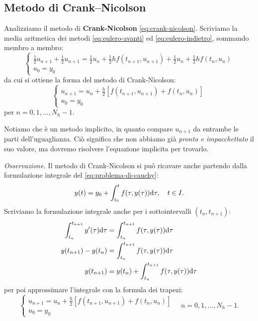 \subsection{Metodo di Crank–Nicolson}
Analizziamo il metodo di \textbf{Crank-Nicolson} \eqref{eq:crank-nicolson}.
Scriviamo la media aritmetica dei metodi \eqref{eq:eulero-avanti} ed \eqref{eq:eulero-indietro}, sommando membro a membro:
\begin{equation*}
\begin{cases}
\frac{1}{2} u_{n+1} +\frac{1}{2} u_{n+1} =\frac{1}{2} u_{n} +\frac{1}{2} hf( t_{n+1} ,u_{n+1}) +\frac{1}{2} u_{n} +\frac{1}{2} hf( t_{n} ,u_{n})\\
u_{0} =y_{0}
\end{cases}
\end{equation*}
da cui si ottiene la forma del metodo di Crank-Nicolson:
\begin{equation}\tag{CN}
	\begin{cases}
	u_{n+1} =u_{n} +\frac{h}{2}[ f( t_{n+1} ,u_{n+1}) +f( t_{n} ,u_{n})]\\
	u_{0} =y_{0}
	\end{cases}
	\label{eq:crank-nicolson}
\end{equation}
per $n=0,1,\dotsc ,N_{h} -1$.

Notiamo che è un metodo implicito, in quanto compare $u_{n+1}$ da entrambe le parti dell'uguaglianza. Ciò significa che non abbiamo già \textit{pronto e impacchettato} il suo valore, ma dovremo risolvere l'equazione implicita per trovarlo. %

\textit{Osservazione.}
Il metodo di Crank-Nicolson si può ricavare anche partendo dalla formulazione integrale del \eqref{eq:problema-di-cauchy}: %
\begin{equation*}
y(t) =y_{0} +\int\nolimits ^{t}_{t_{0}} f( \tau ,y( \tau )) \mathrm d\tau ,\quad t\in I.
\end{equation*}
Scriviamo la formulazione integrale anche per i sottointervalli $( t_{n} ,t_{n+1})$:
\begin{align*}
\int\nolimits ^{t_{n+1}}_{t_{n}} y'( \tau ) \mathrm d\tau  & =\int\nolimits ^{t_{n+1}}_{t_{n}} f( \tau ,y( \tau )) \mathrm d\tau \\
y( t_{n+1}) -y( t_{n}) & =\int\nolimits ^{t_{n+1}}_{t_{n}} f( \tau ,y( \tau )) \mathrm d\tau \\
y( t_{n+1}) & =y( t_{n}) +\int\nolimits ^{t_{n+1}}_{t_{n}} f( \tau ,y( \tau )) \mathrm d\tau
\end{align*}
per poi approssimare l'integrale con la formula dei trapezi:
\begin{equation*}
\begin{cases}
u_{n+1} =u_{n} +\frac{h}{2}[ f( t_{n+1} ,u_{n+1}) +f( t_{n} ,u_{n})]\\
u_{0} =y_{0}
\end{cases} \quad n=0,1,\dotsc ,N_{h} -1.
\end{equation*}

